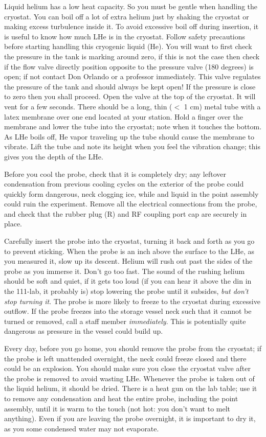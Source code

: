 \documentclass{../lab}
\begin{document}
Liquid helium has a low heat capacity. So you must be gentle when handling the cryostat. You can boil off a lot of extra helium just by shaking the cryostat or making excess turbulence inside it. To avoid excessive boil off during insertion, it is useful to know how much LHe is in the cryostat. Follow safety precautions before starting handling this cryogenic liquid (He). You will want to first check the pressure in the tank is marking around zero, if this is not the case then check if the flow valve directly position opposite to the pressure valve (180 degrees) is open; if not contact Don Orlando or a professor immediately. This valve regulates the pressure of the tank and should always be kept open! If the pressure is close to zero then you shall proceed. Open the valve at the top of the cryostat. It will vent for a few seconds. There should be a long, thin ($<$ 1 cm) metal tube with a latex membrane over one end located at your station. Hold a finger over the membrane and lower the tube into the cryostat; note when it touches the bottom. As LHe boils off, He vapor traveling up the tube should cause the membrane to vibrate. Lift the tube and note its height when you feel the vibration change; this gives you the depth of the LHe.

Before you cool the probe, check that it is completely dry; any leftover condensation from previous cooling cycles on the exterior of the probe could quickly form dangerous, neck clogging ice, while and liquid in the point assembly could ruin the experiment. Remove all the electrical connections from the probe, and check that the rubber plug (R) and RF coupling port cap are securely in place.

Carefully insert the probe into the cryostat, turning it back and forth as you go to prevent sticking. When the probe is an inch above the surface to the LHe, as you measured it, slow up its descent. Helium will rush out past the sides of the probe as you immerse it. Don't go too fast. The sound of the rushing helium should be soft and quiet, if it gets too loud (if you can hear it above the din in the 111-lab, it probably is) stop lowering the probe until it subsides, \emph{but don't stop turning it}. The probe is more likely to freeze to the cryostat during excessive outflow. If the probe freezes into the storage vessel neck such that it cannot be turned or removed, call a staff member \emph{immediately}. This is potentially quite dangerous as pressure in the vessel could build up.

Every day, before you go home, you should remove the probe from the cryostat; if the probe is left unattended overnight, the neck could freeze closed and there could be an explosion. You should make sure you close the cryostat valve after the probe is removed to avoid wasting LHe. Whenever the probe is taken out of the liquid helium, it should be dried. There is a heat gun on the lab table; use it to remove any condensation and heat the entire probe, including the point assembly, until it is warm to the touch (not hot: you don't want to melt anything). Even if you are leaving the probe overnight, it is important to dry it, as you some condensed water may not evaporate.
\end{document}
